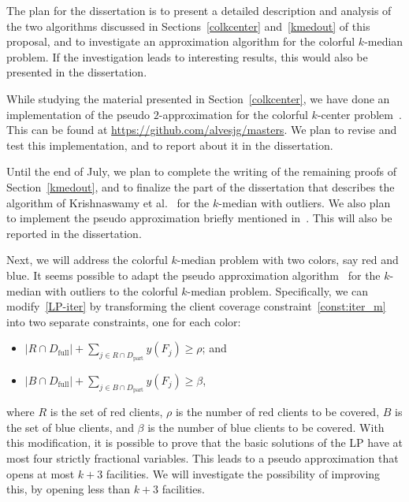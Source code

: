 The plan for the dissertation is to present a detailed description and analysis of the two algorithms discussed in Sections~\ref{colkcenter} and~\ref{kmedout} of this proposal, and to investigate an approximation algorithm for the colorful $k$-median problem. If the investigation leads to interesting results, this would also be presented in the dissertation.

While studying the material presented in Section~\ref{colkcenter}, we have done an implementation of the pseudo $2$-approximation for the colorful $k$-center problem~\cite{JSS2020}.
This can be found at \url{https://github.com/alvesjg/masters}. We plan to revise and test this implementation, and to report about it in the dissertation. 

Until the end of July, we plan to complete the writing of the remaining proofs of Section~\ref{kmedout}, and to finalize the part of the dissertation that describes the algorithm of 
Krishnaswamy et al.~\cite{KLS2018} for the $k$-median with outliers. 
We also plan to implement the pseudo approximation briefly mentioned in~\cite[Sects.~1.4 and~4.1]{KLS2018}. This will also be reported in the dissertation. 

Next, we will address the colorful $k$-median problem with two colors, say red and blue. It seems possible to adapt the pseudo approximation algorithm~\cite{KLS2018} for the $k$-median with outliers to the colorful $k$-median problem. Specifically, we can modify~\eqref{LP-iter} by transforming the client coverage constraint~\eqref{const:iter_m} into two separate constraints, one for each color:
\begin{itemize}
   \item $| R \cap D_\text{full}| + \sum_{j \in R \cap D_\text{part}} y(F_j) \ge \rho$; and
   \item $| B \cap D_\text{full}| + \sum_{j \in B \cap D_\text{part}} y(F_j) \ge \beta$,
\end{itemize}
where $R$ is the set of red clients, $\rho$ is the number of red clients to be covered, $B$ is the set of blue clients, and $\beta$ is the number of blue clients to be covered.
With this modification, it is possible to prove that the basic solutions of the LP have at most four strictly fractional variables. This leads to a pseudo approximation that opens at most $k+3$ facilities. We will investigate the possibility of improving this, by opening less than $k+3$ facilities. 

